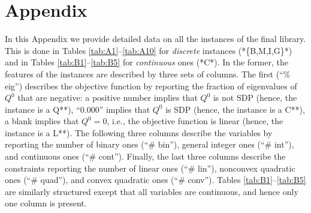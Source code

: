 
\section*{Appendix}\label{sec:appendix}

In this Appendix we provide detailed data on all the instances of the final library. This is done in Tables \ref{tab:A1}--\ref{tab:A10} for \emph{discrete} instances (*\{B,M,I,G\}*) and in Tables \ref{tab:B1}--\ref{tab:B5} for \emph{continuous} ones (*C*). In the former, the features of the instances are described by three sets of columns. The first (``\% eig'') describes the objective function by reporting the fraction of eigenvalues of $Q^0$ that are negative: a positive number implies that $Q^0$ is not SDP (hence, the instance is a Q**), ``0.000'' implies that $Q^0$ is SDP (hence, the instance is a C**), a blank implies that $Q^0 = 0$, i.e., the objective function is linear (hence, the instance is a L**). The following three columns describe the variables by reporting the number of binary ones (``\# bin''), general integer ones (``\# int''), and continuous ones (``\# cont''). Finally, the last three columns describe the constraints reporting the number of linear ones (``\# lin''), nonconvex quadratic ones (``\# quad''), and convex quadratic ones (``\# conv''). Tables \ref{tab:B1}--\ref{tab:B5} are similarly structured except that all variables are continuous, and hence only one column is present.




